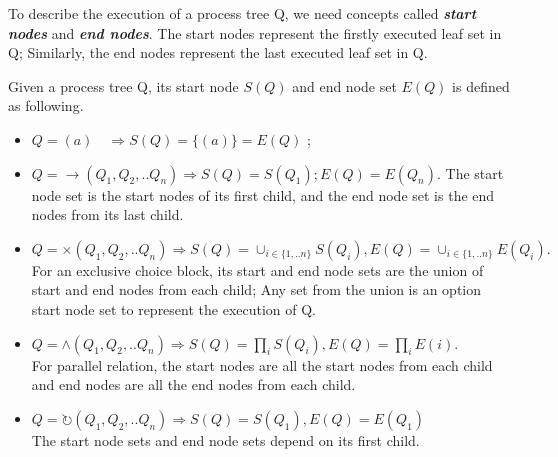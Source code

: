 To describe the execution of  a process tree Q, we need concepts called \textbf{\emph{start nodes}} and \textbf{\emph{end nodes}}. The start nodes represent the firstly executed leaf set in Q; Similarly, the end nodes represent the last executed leaf set in Q. 
\begin{definition}
Given a process tree Q, its start node $S(Q)$ and end node set $E(Q)$ is defined as following. 
\begin{itemize}
	\item  $Q=(a) \quad \Rightarrow S(Q)=\{(a)\}=E(Q)$ ; 
	\item  $Q= \rightarrow(Q_1 , Q_2 ,.. Q_n) \Rightarrow S(Q)= S(Q_1); E(Q)=E(Q_n)$. The start node set is the start nodes of its first child, and the end node set is the end nodes from its last child.
	\item  $Q= \times(Q_1 , Q_2 ,.. Q_n) \Rightarrow S(Q)= \cup_{i\in \{1,..n\}}S(Q_i),E(Q)= \cup_{i\in \{1,..n\}}E(Q_i).$ \\For an exclusive choice block, its start and end node sets are the union of start and end nodes from each child; Any set from the union is an option start node set to represent the execution of Q. 
	\item $Q= \land (Q_1 , Q_2 ,.. Q_n) \Rightarrow S(Q)= \prod_{i} S(Q_i), E(Q)=\prod_{i} E(i)$. \\For parallel relation, the start nodes are all the start nodes from each child and end nodes are all the end nodes from each child.
	\item $Q= \circlearrowright(Q_1 , Q_2 ,.. Q_n) \Rightarrow S(Q)=S(Q_1), E(Q)=E(Q_1)$ \\The start node sets and end node sets depend on its first child.
\end{itemize}
\end{definition}

